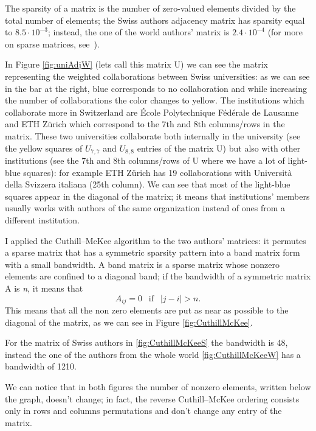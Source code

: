\documentclass[]{usiinfbachelorproject}
\begin{document}
The sparsity of a matrix is the number of zero-valued elements divided by the total number of elements; the Swiss authors adjacency matrix has sparsity equal to $8.5 \cdot 10^{-3}$; instead, the one of the world authors' matrix is $2.4 \cdot 10^{-4}$ (for more on sparse matrices, see~\cite[Chapter 3]{saad}).

In Figure \ref{fig:uniAdjW} (lets call this matrix U) we can see the matrix representing the weighted collaborations between Swiss universities: as we can see in the bar at the right, blue corresponds to no collaboration and while increasing the number of collaborations the color changes to yellow.
The institutions which collaborate more in Switzerland are \'{E}cole Polytechnique F\'{e}d\'{e}rale de Lausanne and ETH Z\"{u}rich which correspond to the 7th and 8th columns/rows in the matrix. These two universities collaborate both internally in the university (see the yellow squares of $U_{7,7}$ and $U_{8,8}$ entries of the matrix U)  but also with other institutions (see the 7th and 8th columns/rows of U where we have a lot of light-blue squares): for example  ETH Z\"{u}rich has 19 collaborations with Universit\`{a} della Svizzera italiana (25th column). 
We can see that most of the light-blue squares appear in the diagonal of the matrix; it means that institutions' members usually works with authors of the same organization instead of ones from a different institution.

I applied the Cuthill--McKee algorithm to the two authors' matrices: it permutes a sparse matrix that has a symmetric sparsity pattern into a band matrix form with a small bandwidth.
A band matrix is a sparse matrix whose nonzero elements are confined to a diagonal band; if the bandwidth of a symmetric matrix A is \textit{n}, it means that 
$$A_{ij} = 0  \:\: \text{ if } \:\: |j-i| > n \text{.}$$
 This means that all the non zero elements are put as near as possible to the diagonal of the matrix, as we can see in Figure \ref{fig:CuthillMcKee}. 
 
For the matrix of Swiss authors in \ref{fig:CuthillMcKeeS} the bandwidth is 48, instead the one of the authors from the whole world \ref{fig:CuthillMcKeeW} has a bandwidth of 1210. 

We can notice that in both figures the number of nonzero elements, written below the graph, doesn't change; in fact, the reverse Cuthill--McKee ordering consists only in rows and columns permutations and don't change any entry of the matrix.
\end{document}
